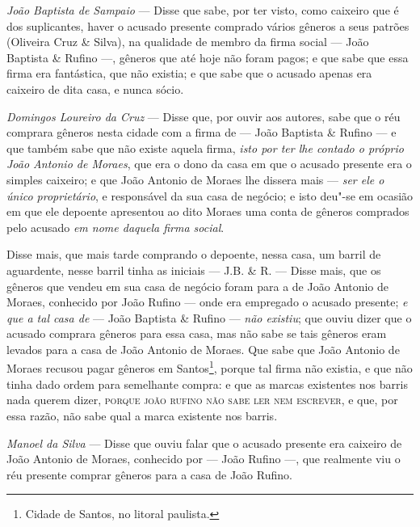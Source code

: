 \noindent\emph{João Baptista de Sampaio} --- Disse que sabe, por ter visto, como
caixeiro que é dos suplicantes, haver o acusado presente comprado vários
gêneros a seus patrões (Oliveira Cruz \& Silva), na qualidade de membro
da firma social --- João Baptista \& Rufino ---, gêneros que até hoje
não foram pagos; e que sabe que essa firma era fantástica, que não
existia; e que sabe que o acusado apenas era caixeiro de dita casa, e
nunca sócio.\medskip

\noindent\emph{Domingos Loureiro da Cruz} --- Disse que, por ouvir aos autores,
sabe que o réu comprara gêneros nesta cidade com a firma de --- João
Baptista \& Rufino --- e que também sabe que não existe aquela firma,
\emph{isto por ter lhe contado o próprio João Antonio de Moraes}, que
era o dono da casa em que o acusado presente era o simples caixeiro; e
que João Antonio de Moraes lhe dissera mais --- \emph{ser ele o único
proprietário}, e responsável da sua casa de negócio; e isto deu"-se em
ocasião em que ele depoente apresentou ao dito Moraes uma conta de
gêneros comprados pelo acusado \emph{em nome daquela firma social}.

Disse mais, que mais tarde comprando o depoente, nessa casa, um barril
de aguardente, nesse barril tinha as iniciais --- J.B. \& R. --- Disse
mais, que os gêneros que vendeu em sua casa de negócio foram para a de
João Antonio de Moraes, conhecido por João Rufino --- onde era
empregado o acusado presente; \emph{e que a tal casa de} --- João Baptista
\& Rufino --- \emph{não existiu}; que ouviu dizer que o acusado
comprara gêneros para essa casa, mas não sabe se tais gêneros eram
levados para a casa de João Antonio de Moraes. Que sabe que João Antonio
de Moraes recusou pagar gêneros em Santos\footnote{Cidade de Santos,
  no litoral paulista.}, porque tal firma não existia, e que não tinha
dado ordem para semelhante compra: e que as marcas existentes nos barris
nada querem dizer, \textsc{porque joão rufino não sabe ler nem escrever}, e que,
por essa razão, não sabe qual a marca existente nos barris.\medskip

\noindent\emph{Manoel da Silva} --- Disse que ouviu falar que o acusado presente
era caixeiro de João Antonio de Moraes, conhecido por --- João Rufino
---, que realmente viu o réu presente comprar gêneros para a casa de
João Rufino.\medskip


